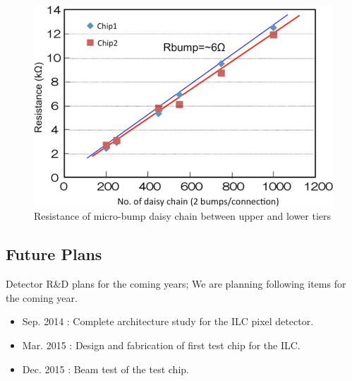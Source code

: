 \begin{figure}
\centering
\includegraphics[width=.5\textwidth]{VertexDetector/SOI/resistanceOfDaisyChain}
\caption{Resistance of micro-bump daisy chain between upper and lower tiers}
\label{fig:VertexDetector:SOI:resistanceOfDaisyChain}
\end{figure}

\subsection{Future Plans}
Detector R\&D plans for the coming years;
We are planning following items for the coming year.
\begin{itemize}
\item Sep. 2014 : Complete architecture study for the ILC pixel detector.
\item Mar. 2015 : Design and fabrication of first test chip for the ILC.
\item Dec. 2015 : Beam test of the test chip.
\end{itemize}
